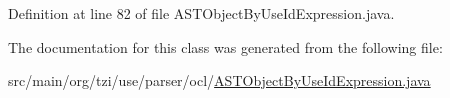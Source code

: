 Definition at line 82 of file A\-S\-T\-Object\-By\-Use\-Id\-Expression.\-java.



The documentation for this class was generated from the following file\-:\begin{DoxyCompactItemize}
\item 
src/main/org/tzi/use/parser/ocl/\hyperlink{_a_s_t_object_by_use_id_expression_8java}{A\-S\-T\-Object\-By\-Use\-Id\-Expression.\-java}\end{DoxyCompactItemize}
